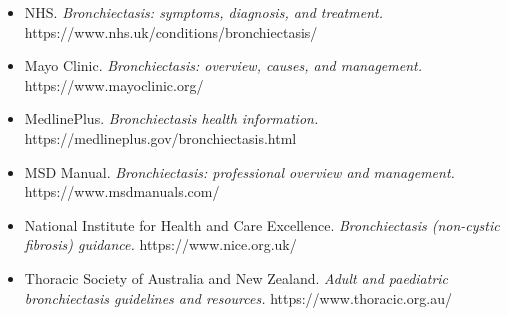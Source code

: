 \begin{itemize}
    \item NHS. \textit{Bronchiectasis: symptoms, diagnosis, and treatment.} https://www.nhs.uk/conditions/bronchiectasis/
    \item Mayo Clinic. \textit{Bronchiectasis: overview, causes, and management.} https://www.mayoclinic.org/
    \item MedlinePlus. \textit{Bronchiectasis health information.} https://medlineplus.gov/bronchiectasis.html
    \item MSD Manual. \textit{Bronchiectasis: professional overview and management.} https://www.msdmanuals.com/
    \item National Institute for Health and Care Excellence. \textit{Bronchiectasis (non-cystic fibrosis) guidance.} https://www.nice.org.uk/
    \item Thoracic Society of Australia and New Zealand. \textit{Adult and paediatric bronchiectasis guidelines and resources.} https://www.thoracic.org.au/
\end{itemize}
